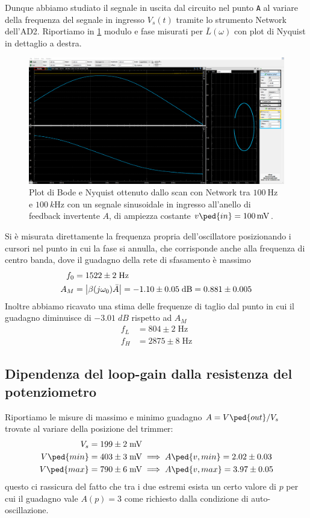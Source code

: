 \documentclass[10pt, a4paper, italian]{article}
\begin{document}
Dunque abbiamo studiato il segnale in uscita dal circuito nel punto \verb+A+
al variare della frequenza del segnale in ingresso $V_s (t)$ tramite lo
strumento Network dell'AD2. Riportiamo in \cref{fig: loopbode} modulo e fase
misurati per $\bar{L}(\omega)$ con plot di Nyquist in dettaglio a destra.
\begin{figure}[htbp]
    \centering
	\includegraphics[scale=0.335]{Aloop100Hz}
    \caption{Plot di Bode e Nyquist ottenuto dallo scan con Network tra
    $\SI{100}{\Hz}$ e $\SI{100}{k\Hz}$ con un segnale sinusoidale in ingresso
    all'anello di feedback invertente $A$, di ampiezza costante
    $v\ped{in} = \SI{100}{m\V}$. \label{fig: loopbode}}
\end{figure}

Si è misurata direttamente la frequenza propria dell'oscillatore posizionando
i cursori nel punto in cui la fase si annulla, che corrisponde anche alla
frequenza di centro banda, dove il guadagno della rete di sfasamento è massimo
\begin{align*}
f_0 &= 1522 \pm 2 \; \si{\Hz} \\
A_M &= \abs{\beta(j \omega_0) \bar{A}} =
-1.10 \pm 0.05 \; \si{dB} = 0.881 \pm 0.005
\end{align*}
Inoltre abbiamo ricavato una stima delle frequenze di taglio dal punto in cui
il guadagno diminuisce di $-3.01 \; \si{dB}$ rispetto ad $A_M$
\begin{align*}
f_L &= 804 \pm 2 \; \si{\Hz} \\
f_H &= 2875 \pm 8 \; \si{\Hz}
\end{align*}

\subsection{Dipendenza del loop-gain dalla resistenza del potenziometro}
Riportiamo le misure di massimo e minimo guadagno $A = V\ped{out}/V_s$
trovate al variare della posizione del trimmer:
\begin{align*}
V_s &= 199 \pm 2 \; \si{m\V} \\
V\ped{min} &= 403 \pm 3 \; \si{m\V} \implies  A\ped{v, min} =
2.02 \pm 0.03 \\
V\ped{max} &= 790 \pm 6 \; \si{m\V} \implies  A\ped{v, max} =
3.97 \pm 0.05\\
\end{align*}
questo ci rassicura del fatto che tra i due estremi esista un certo valore di
$p$ per cui il guadagno vale $A(p) = 3$ come richiesto dalla condizione di
auto-oscillazione.
\end{document}
